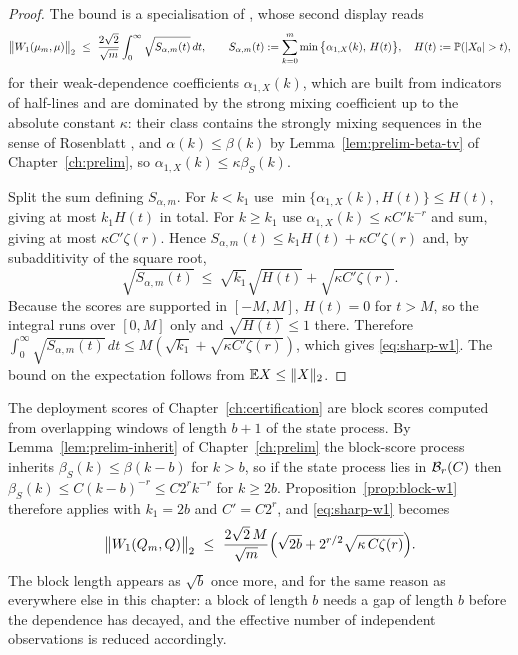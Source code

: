 \documentclass[../../../main.tex]{subfiles}
\begin{document}
\begin{proof}
The bound is a specialisation of \citet[Prop.~3.2, eqs.~(3.7)--(3.8)]{dedecker2017}, whose second display reads
\[
\big\|\Wone(\mu_m,\mu)\big\|_2\ \le\ \frac{2\sqrt2}{\sqrt m}\int_0^\infty\sqrt{S_{\alpha,m}(t)}\,dt,\qquad
S_{\alpha,m}(t):=\sum_{k=0}^m\min\big\{\alpha_{1,X}(k),\,H(t)\big\},\quad H(t):=\Prob(|X_0|>t),
\]
for their weak-dependence coefficients $\alpha_{1,X}(k)$, which are built from indicators of half-lines and are dominated by the strong mixing coefficient up to the absolute constant $\kappa$: their class contains the strongly mixing sequences in the sense of Rosenblatt \citep[\S1]{dedecker2017}, and $\alpha(k)\le\beta(k)$ by Lemma~\ref{lem:prelim-beta-tv} of Chapter~\ref{ch:prelim}, so $\alpha_{1,X}(k)\le\kappa\beta_S(k)$.

Split the sum defining $S_{\alpha,m}$. For $k<k_1$ use $\min\{\alpha_{1,X}(k),H(t)\}\le H(t)$, giving at most $k_1H(t)$ in total. For $k\ge k_1$ use $\alpha_{1,X}(k)\le\kappa C'k^{-r}$ and sum, giving at most $\kappa C'\zeta(r)$. Hence $S_{\alpha,m}(t)\le k_1H(t)+\kappa C'\zeta(r)$ and, by subadditivity of the square root,
\[
\sqrt{S_{\alpha,m}(t)}\ \le\ \sqrt{k_1}\sqrt{H(t)}+\sqrt{\kappa C'\zeta(r)} .
\]
Because the scores are supported in $[-M,M]$, $H(t)=0$ for $t>M$, so the integral runs over $[0,M]$ only and $\sqrt{H(t)}\le1$ there. Therefore $\int_0^\infty\sqrt{S_{\alpha,m}(t)}\,dt\le M(\sqrt{k_1}+\sqrt{\kappa C'\zeta(r)})$, which gives \eqref{eq:sharp-w1}. The bound on the expectation follows from $\mathbb{E} X\le\|X\|_2$.
\end{proof}

\begin{remark}\label{rem:sharp-w1-apply}
The deployment scores of Chapter~\ref{ch:certification} are block scores computed from overlapping windows of length $b+1$ of the state process. By Lemma~\ref{lem:prelim-inherit} of Chapter~\ref{ch:prelim} the block-score process inherits $\beta_S(k)\le\beta(k-b)$ for $k>b$, so if the state process lies in $\mathcal B_{r}(C)$ then $\beta_S(k)\le C(k-b)^{-r}\le C2^rk^{-r}$ for $k\ge2b$. Proposition~\ref{prop:block-w1} therefore applies with $k_1=2b$ and $C'=C2^r$, and \eqref{eq:sharp-w1} becomes
\[
\big\|\Wone(Q_m,Q)\big\|_2\ \le\ \frac{2\sqrt2\,M}{\sqrt m}\Big(\sqrt{2b}+2^{r/2}\sqrt{\kappa\,C\zeta(r)}\Big) .
\]
The block length appears as $\sqrt b$ once more, and for the same reason as everywhere else in this chapter: a block of length $b$ needs a gap of length $b$ before the dependence has decayed, and the effective number of independent observations is reduced accordingly.
\end{remark}
\end{document}
